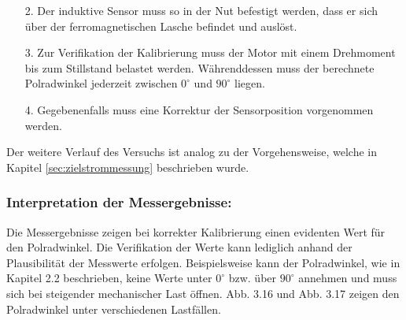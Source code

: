 \begin{itemize}
\begin{figure}[H]
		\caption{Aufbau Kalibrieren}
		\label{fig:kalibrieren}
	\end{figure}
	
	 Abbildung \ref{fig:kalibrieren} ist der Aufbau für das bestromen der Stränge zu entnehmen. An der  3 Fold DC Supply sind folgende Einstellungen vorzunehmen: $V1=7\si{\volt} \text{, }V2=-3,5\si{\volt} \text{, }V3=-3,5\si{\volt}$.
	
	
	\item[2.] Der induktive Sensor muss so in der Nut befestigt werden, dass er sich über der ferromagnetischen Lasche befindet und auslöst.
	\item[3.] Zur Verifikation der Kalibrierung muss der Motor mit einem Drehmoment bis zum Stillstand belastet werden. Währenddessen muss der berechnete Polradwinkel jederzeit zwischen \(0^\circ\) und \(90^\circ\) liegen.
	\item[4.] Gegebenenfalls muss eine Korrektur der Sensorposition vorgenommen werden.
	
\end{itemize}

Der weitere Verlauf des Versuchs ist analog zu der Vorgehensweise, welche in Kapitel \ref{sec:zielstrommessung} beschrieben wurde.

\subsubsection{Interpretation der Messergebnisse:}

Die Messergebnisse zeigen bei korrekter Kalibrierung einen evidenten Wert für den Polradwinkel. Die Verifikation der Werte kann lediglich anhand der Plausibilität der Messwerte erfolgen. Beispielsweise kann der Polradwinkel, wie in Kapitel 2.2 beschrieben, keine Werte unter \(0^\circ\)  bzw. über \(90^\circ\) annehmen und muss sich bei steigender mechanischer Last öffnen. Abb. 3.16 und Abb. 3.17 zeigen den Polradwinkel unter verschiedenen Lastfällen.


